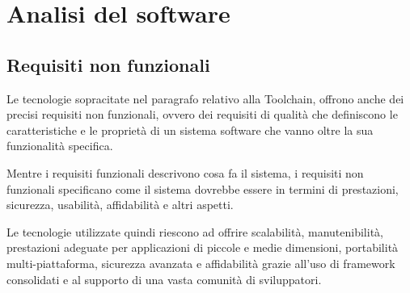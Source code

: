 \section{Analisi del software}
\subsection{Requisiti non funzionali}
Le tecnologie sopracitate nel paragrafo relativo alla Toolchain, offrono anche dei precisi
requisiti non funzionali, ovvero dei requisiti di qualità che definiscono le caratteristiche 
e le proprietà di un sistema software che vanno oltre la sua funzionalità specifica. 

Mentre i requisiti funzionali descrivono cosa fa il sistema, i requisiti non funzionali specificano come 
il sistema dovrebbe essere in termini di prestazioni, sicurezza, usabilità, affidabilità e altri aspetti.

Le tecnologie utilizzate quindi riescono ad offrire scalabilità, manutenibilità, prestazioni adeguate per 
applicazioni di piccole e medie dimensioni, portabilità multi-piattaforma, sicurezza avanzata e affidabilità 
grazie all'uso di framework consolidati e al supporto di una vasta comunità di sviluppatori.

